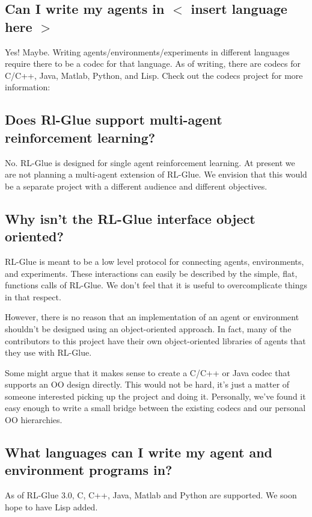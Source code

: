 \documentclass[11pt]{article}
\begin{document}
\subsection{Can I write my agents in $<$ insert language here $>$}
Yes! Maybe.  Writing agents/environments/experiments in different languages require there to be a codec for that language.  As of writing, there are codecs for C/C++, Java, Matlab, Python, and Lisp.  Check out the codecs project for more information:\newline
{}

\subsection{Does Rl-Glue support multi-agent reinforcement learning?}
 No. RL-Glue is designed for single agent reinforcement learning. At present we are not planning a multi-agent extension of RL-Glue. We envision that this would be a separate project with a different audience and different objectives.  
 
\subsection{Why isn't the RL-Glue interface object oriented?}
RL-Glue is meant to be a low level protocol for connecting agents, environments, and experiments.  These interactions can
easily be described by the simple, flat, functions calls of RL-Glue.  We don't feel that it is useful to overcomplicate
things in that respect.

However, there is no reason that an implementation of an agent or environment shouldn't be designed using an object-oriented 
approach.  In fact, many of the contributors to this project have their own object-oriented libraries of agents that 
they use with RL-Glue.

Some might argue that it makes sense to create a C/C++ or Java codec that supports an OO design
directly.  This would not be hard, it's just a matter of someone interested picking up the project and doing it.  Personally, 
we've found it easy enough to write a small bridge between the existing codecs and our personal OO hierarchies.

\subsection{What languages can I write my agent and environment programs in?}
As of RL-Glue 3.0, C, C++, Java, Matlab and Python are supported. We soon hope to have Lisp added.
\end{document}
